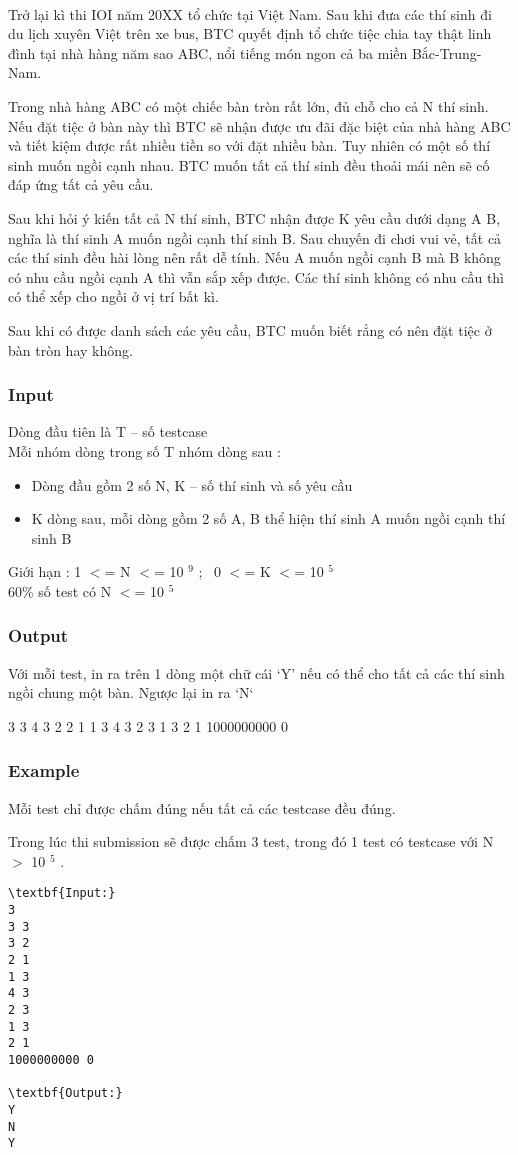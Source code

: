 

 

Trở lại kì thi IOI năm 20XX tổ chức tại Việt Nam. Sau khi đưa các thí sinh đi du lịch xuyên Việt trên xe bus, BTC quyết định tổ chức tiệc chia tay thật linh đình tại nhà hàng năm sao ABC, nổi tiếng món ngon cả ba miền Bắc-Trung-Nam.

Trong nhà hàng ABC có một chiếc bàn tròn rất lớn, đủ chỗ cho cả N thí sinh. Nếu đặt tiệc ở bàn này thì BTC sẽ nhận được ưu đãi đặc biệt của nhà hàng ABC và tiết kiệm được rất nhiều tiền so với đặt nhiều bàn. Tuy nhiên có một số thí sinh muốn ngồi cạnh nhau. BTC muốn tất cả thí sinh đều thoải mái nên sẽ cố đáp ứng tất cả yêu cầu.

Sau khi hỏi ý kiến tất cả N thí sinh, BTC nhận được K yêu cầu dưới dạng A B, nghĩa là thí sinh A muốn ngồi cạnh thí sinh B. Sau chuyến đi chơi vui vẻ, tất cả các thí sinh đều hài lòng nên rất dễ tính. Nếu A muốn ngồi cạnh B mà B không có nhu cầu ngồi cạnh A thì vẫn sắp xếp được. Các thí sinh không có nhu cầu thì có thể xếp cho ngồi ở vị trí bất kì.

Sau khi có được danh sách các yêu cầu, BTC muốn biết rẳng có nên đặt tiệc ở bàn tròn hay không.

\subsubsection{Input}

Dòng đầu tiên là T – số testcase
\\Mỗi nhóm dòng trong số T nhóm dòng sau :
\begin{itemize}
	\item Dòng đầu gồm 2 số N, K – số thí sinh và số yêu cầu
	\item K dòng sau, mỗi dòng gồm 2 số A, B thể hiện thí sinh A muốn ngồi cạnh thí sinh B
\end{itemize}

Giới hạn : 1 $<$= N $<$= 10 $^ 9 $ ;  0 $<$= K $<$= 10 $^ 5 $
\\60\% số test có N $<$= 10 $^ 5 $

\subsubsection{Output}

Với mỗi test, in ra trên 1 dòng một chữ cái ‘Y’ nếu có thể cho tất cả các thí sinh ngồi chung một bàn. Ngược lại in ra ‘N‘

3 3 4 3 2 2 1 1 3 4 3 2 3 1 3 2 1 1000000000 0

\subsubsection{Example}

Mỗi test chỉ được chấm đúng nếu tất cả các testcase đều đúng.

Trong lúc thi submission sẽ được chấm 3 test, trong đó 1 test có testcase với N $>$ 10 $^ 5 $ .
\begin{verbatim}
\textbf{Input:}
3
3 3
3 2
2 1
1 3
4 3
2 3
1 3
2 1
1000000000 0

\textbf{Output:}
Y
N
Y\end{verbatim}